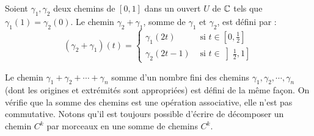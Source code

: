 \begin{fdefn}
Soient $\gamma_1, \gamma_2$ deux chemins de $[0,1]$ dans un ouvert $U$ de $\mathbb{C}$ tels que $\gamma_1(1) =
\gamma_2(0)$. Le chemin $\gamma_2 + \gamma_1$, somme de $\gamma_1$ et
$\gamma_2$, est défini par :
\[(\gamma_2 + \gamma_1)(t) = \left \{
\begin{array}{cc}
\gamma_1(2t) & \text{ si } t \in \left[0,\frac{1}{2}\right] \\
\gamma_2(2t-1) & \text{ si } t \in \left]\frac{1}{2},1\right]
\end{array}
\right.
\]
\end{fdefn}

Le chemin $\gamma_1 + \gamma_2 + \cdots + \gamma_n$ somme d'un nombre fini des chemins $\gamma_1,\gamma_2,\cdots, \gamma_n$ (dont les origines et extrémités sont appropriées) est défini de la même façon. On vérifie que la somme des chemins est une opération associative, elle n'est pas commutative. Notons qu'il est toujours possible d'écrire de décomposer un chemin $C^k$ par morceaux en une somme de chemins $C^k$. 


